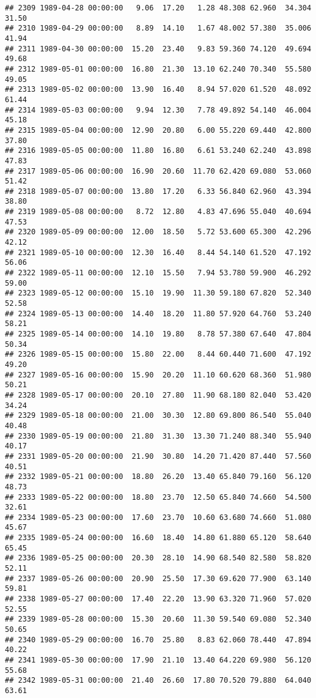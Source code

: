 \documentclass{article}\usepackage{graphicx, color}
\makeatletter
\newenvironment{kframe}{%
 \def\at@end@of@kframe{}%
 \ifinner\ifhmode%
  \def\at@end@of@kframe{\end{minipage}}%
  \begin{minipage}{\columnwidth}%
 \fi\fi%
 \def\FrameCommand##1{\hskip\@totalleftmargin \hskip-\fboxsep
 \colorbox{shadecolor}{##1}\hskip-\fboxsep
     \hskip-\linewidth \hskip-\@totalleftmargin \hskip\columnwidth}%
 \MakeFramed {\advance\hsize-\width
   \@totalleftmargin\z@ \linewidth\hsize
   \@setminipage}}%
 {\par\unskip\endMakeFramed%
 \at@end@of@kframe}
\newenvironment{knitrout}{}{} %
\makeatother
\begin{document}
\begin{knitrout}
\begin{kframe}
\begin{verbatim}
## 2309 1989-04-28 00:00:00   9.06  17.20   1.28 48.308 62.960  34.304  31.50
## 2310 1989-04-29 00:00:00   8.89  14.10   1.67 48.002 57.380  35.006  41.94
## 2311 1989-04-30 00:00:00  15.20  23.40   9.83 59.360 74.120  49.694  49.68
## 2312 1989-05-01 00:00:00  16.80  21.30  13.10 62.240 70.340  55.580  49.05
## 2313 1989-05-02 00:00:00  13.90  16.40   8.94 57.020 61.520  48.092  61.44
## 2314 1989-05-03 00:00:00   9.94  12.30   7.78 49.892 54.140  46.004  45.18
## 2315 1989-05-04 00:00:00  12.90  20.80   6.00 55.220 69.440  42.800  37.80
## 2316 1989-05-05 00:00:00  11.80  16.80   6.61 53.240 62.240  43.898  47.83
## 2317 1989-05-06 00:00:00  16.90  20.60  11.70 62.420 69.080  53.060  51.42
## 2318 1989-05-07 00:00:00  13.80  17.20   6.33 56.840 62.960  43.394  38.80
## 2319 1989-05-08 00:00:00   8.72  12.80   4.83 47.696 55.040  40.694  47.53
## 2320 1989-05-09 00:00:00  12.00  18.50   5.72 53.600 65.300  42.296  42.12
## 2321 1989-05-10 00:00:00  12.30  16.40   8.44 54.140 61.520  47.192  56.06
## 2322 1989-05-11 00:00:00  12.10  15.50   7.94 53.780 59.900  46.292  59.00
## 2323 1989-05-12 00:00:00  15.10  19.90  11.30 59.180 67.820  52.340  52.58
## 2324 1989-05-13 00:00:00  14.40  18.20  11.80 57.920 64.760  53.240  58.21
## 2325 1989-05-14 00:00:00  14.10  19.80   8.78 57.380 67.640  47.804  50.34
## 2326 1989-05-15 00:00:00  15.80  22.00   8.44 60.440 71.600  47.192  49.20
## 2327 1989-05-16 00:00:00  15.90  20.20  11.10 60.620 68.360  51.980  50.21
## 2328 1989-05-17 00:00:00  20.10  27.80  11.90 68.180 82.040  53.420  34.24
## 2329 1989-05-18 00:00:00  21.00  30.30  12.80 69.800 86.540  55.040  40.48
## 2330 1989-05-19 00:00:00  21.80  31.30  13.30 71.240 88.340  55.940  40.17
## 2331 1989-05-20 00:00:00  21.90  30.80  14.20 71.420 87.440  57.560  40.51
## 2332 1989-05-21 00:00:00  18.80  26.20  13.40 65.840 79.160  56.120  48.73
## 2333 1989-05-22 00:00:00  18.80  23.70  12.50 65.840 74.660  54.500  32.61
## 2334 1989-05-23 00:00:00  17.60  23.70  10.60 63.680 74.660  51.080  45.67
## 2335 1989-05-24 00:00:00  16.60  18.40  14.80 61.880 65.120  58.640  65.45
## 2336 1989-05-25 00:00:00  20.30  28.10  14.90 68.540 82.580  58.820  52.11
## 2337 1989-05-26 00:00:00  20.90  25.50  17.30 69.620 77.900  63.140  59.81
## 2338 1989-05-27 00:00:00  17.40  22.20  13.90 63.320 71.960  57.020  52.55
## 2339 1989-05-28 00:00:00  15.30  20.60  11.30 59.540 69.080  52.340  50.65
## 2340 1989-05-29 00:00:00  16.70  25.80   8.83 62.060 78.440  47.894  40.22
## 2341 1989-05-30 00:00:00  17.90  21.10  13.40 64.220 69.980  56.120  55.68
## 2342 1989-05-31 00:00:00  21.40  26.60  17.80 70.520 79.880  64.040  63.61

\end{verbatim}
\end{kframe}
\end{knitrout}
\end{document}
